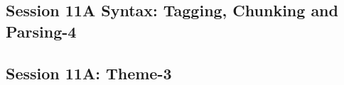\subsection{\large Session 11A Syntax: Tagging, Chunking and Parsing-4}
\label{parallel-session-11A-trackI}
\TrackILoc\hfill\sessionchair{}{}
\clearpage
\subsection{\large Session 11A: Theme-3}
\label{parallel-session-11A-trackJ}
\TrackJLoc\hfill\sessionchair{}{}
\clearpage


